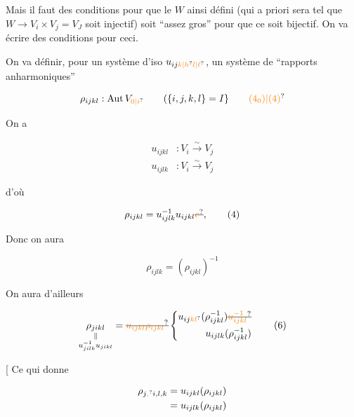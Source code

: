 Mais il faut des conditions pour que le $W$ ainsi défini (qui a priori sera tel que $W\longrightarrow V_i\times V_j=V_J$  soit injectif) soit ``assez gros'' pour que ce soit bijectif. On va écrire des conditions pour ceci.


On va définir, pour un système d'iso $u_{ij\unsure{k|h}\unsure{l|\ell}}$, un système de ``rapports anharmoniques''

\[
\rho_{ijkl}:\operatorname{Aut}V_{\unsure{0|i}}\qquad(\{i,j,k,l\}=I\}\tag*{\unsure{$(4_0)$|(4)}}
\]

On a

\[
\begin{aligned}
u_{ijkl}&: V_i\xrightarrow{\sim}V_j\\
u_{ijlk}&: V_i\xrightarrow{\sim}V_j
\end{aligned}
\]


d'où

\[
 \rho_{ijkl}=u_{ijlk}^{-1}u_{ijkl}\deleted{\unsure{e}},\tag*{(4)}
\]


Donc on aura

\[
 \rho_{ijlk}=(\rho_{ijkl})^{-1}\tag*{(5)}
\]


On aura d'ailleurs

\[
\underset{\substack{\Vert\\u_{jilk}^{-1}u_{jikl}}}{\rho_{jikl}}=
\deleted{\unsure{u_{ijkl}\rho_{ijkl}}}
\left\{\begin{aligned}
 u_{ij\unsure{kl}}(\rho_{ijkl}^{-1})\deleted{\unsure{u_{ijkl}^{-1}}}\\
 u_{ijlk}(\rho_{ijkl}^{-1})
\end{aligned}\right.\tag*{(6)}
\]


[ Ce qui donne

\[
\begin{aligned}
\rho_{j\unsure{,}i,l,k}&=u_{ijkl}(\rho_{ijkl})\\
 &=u_{ijlk}(\rho_{ijkl})
\end{aligned}
\]


